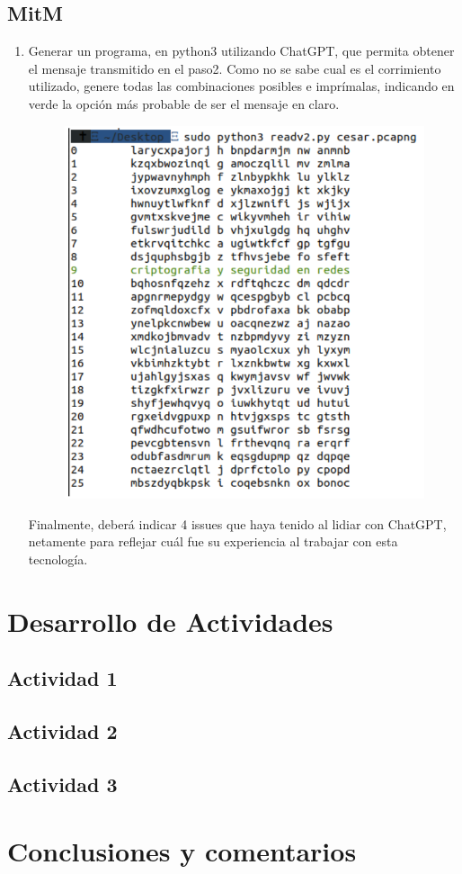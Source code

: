 \documentclass[letter,12pt]{article}
\begin{document}
\subsection{MitM}
\begin{enumerate}
    \item Generar un programa, en python3 utilizando ChatGPT, que permita obtener el mensaje transmitido en el paso2. Como no se sabe cual es el corrimiento utilizado, genere todas las combinaciones posibles e imprímalas, indicando en verde la opción más probable de ser el mensaje en claro.
    \begin{figure}[H]
        \centering
        \includegraphics[width=12cm]{actividades/A3.png}
        \label{fig:a3}
    \end{figure}
    Finalmente, deberá indicar 4 issues que haya tenido al lidiar con ChatGPT, netamente para reflejar cuál fue su experiencia al trabajar con esta tecnología.

\end{enumerate}

\section{Desarrollo de Actividades}

\subsection{Actividad 1}

\subsection{Actividad 2}

\subsection{Actividad 3}



\section*{Conclusiones y comentarios}
\end{document}

